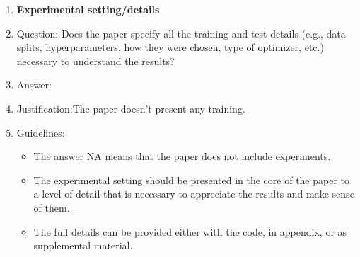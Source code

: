 \documentclass{article}
\begin{document}
\begin{enumerate}
\item {\bf Experimental setting/details}
    \item[] Question: Does the paper specify all the training and test details (e.g., data splits, hyperparameters, how they were chosen, type of optimizer, etc.) necessary to understand the results?
    \item[] Answer: \answerNA{} %
    \item[] Justification:The paper doesn't present any training.
    \item[] Guidelines:
    \begin{itemize}
        \item The answer NA means that the paper does not include experiments.
        \item The experimental setting should be presented in the core of the paper to a level of detail that is necessary to appreciate the results and make sense of them.
        \item The full details can be provided either with the code, in appendix, or as supplemental material.
    \end{itemize}


\end{enumerate}
\end{document}
